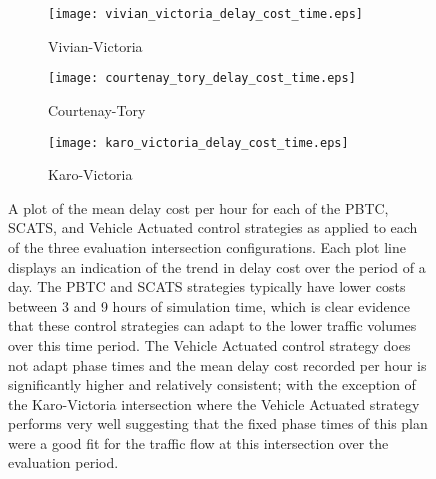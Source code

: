 \begin{figure}[H]
\centering
\begin{subfigure}{.5\textwidth}
  \centering
  \texttt{[image: vivian\_victoria\_delay\_cost\_time.eps]}
  \caption{Vivian-Victoria}
  \label{delay_cost_time:sub1}
\end{subfigure}%
\begin{subfigure}{.5\textwidth}
  \centering
  \texttt{[image: courtenay\_tory\_delay\_cost\_time.eps]}
  \caption{Courtenay-Tory}
  \label{delay_cost_time:sub2}
\end{subfigure}

\vspace{1cm}

\begin{subfigure}{.5\textwidth}
  \centering
  \texttt{[image: karo\_victoria\_delay\_cost\_time.eps]}
  \caption{Karo-Victoria}
  \label{delay_cost_time:sub3}
\end{subfigure}%
\caption{ A plot of the mean delay cost per hour for each of the PBTC, SCATS, and Vehicle Actuated control strategies as applied to each of the three evaluation intersection configurations. Each plot line displays an indication of the trend in delay cost over the period of a day. The PBTC and SCATS strategies typically have lower costs between 3 and 9 hours of simulation time, which is clear evidence that these control strategies can adapt to the lower traffic volumes over this time period. The Vehicle Actuated control strategy does not adapt phase times and the mean delay cost recorded per hour is significantly higher and relatively consistent; with the exception of the Karo-Victoria intersection where the Vehicle Actuated strategy performs very well suggesting that the fixed phase times of this plan were a good fit for the traffic flow at this intersection over the evaluation period. }
\label{eval:delay_cost_time}
\end{figure}

